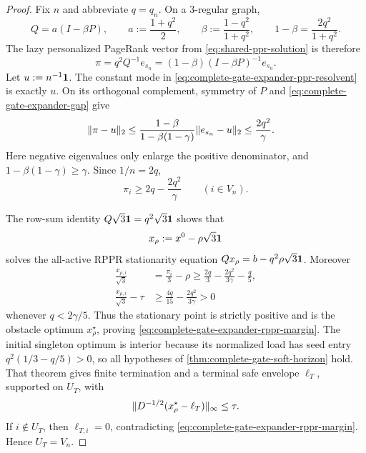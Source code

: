 \begin{proof}
Fix $n$ and abbreviate $q=q_n$.  On a $3$-regular graph,
\begin{equation*}
 Q=a(I-\beta P),
 \qquad
 a:=\frac{1+q^2}{2},
 \qquad
 \beta:=\frac{1-q^2}{1+q^2},
 \qquad
 1-\beta=\frac{2q^2}{1+q^2}.
\end{equation*}
The lazy personalized PageRank vector from
\cref{eq:shared-ppr-solution} is therefore
\begin{equation}
 \pi=q^2Q^{-1}e_{s_n}
     =(1-\beta)(I-\beta P)^{-1}e_{s_n}.
 \label{eq:complete-gate-expander-ppr-resolvent}
\end{equation}
Let $u:=n^{-1}\mathbf{1}$.  The constant mode in
\cref{eq:complete-gate-expander-ppr-resolvent} is exactly $u$.  On its
orthogonal complement, symmetry of $P$ and
\cref{eq:complete-gate-expander-gap} give
\begin{align}
 \lVert\pi-u\rVert_2
 &\leq
 \frac{1-\beta}{1-\beta(1-\gamma)}
 \lVert e_{s_n}-u\rVert_2
 \leq\frac{2q^2}{\gamma}.
 \label{eq:complete-gate-expander-ppr-deviation}
\end{align}
Here negative eigenvalues only enlarge the positive denominator, and
$1-\beta(1-\gamma)\geq\gamma$.  Since $1/n=2q$,
\begin{equation}
 \pi_i\geq2q-\frac{2q^2}{\gamma}
 \qquad(i\in V_n).
 \label{eq:complete-gate-expander-ppr-floor}
\end{equation}

The row-sum identity $Q\sqrt3\mathbf{1}=q^2\sqrt3\mathbf{1}$ shows that
\begin{equation}
 x_{\rho} := x^0-\rho\sqrt3\mathbf{1}
 \label{eq:complete-gate-expander-shifted-point}
\end{equation}
solves the all-active RPPR stationarity equation
$Qx_\rho=b-q^2\rho\sqrt3\mathbf{1}$.  Moreover
\begin{align}
 \frac{x_{\rho,i}}{\sqrt3}
 &=\frac{\pi_i}{3}-\rho
 \geq\frac{2q}{3}-\frac{2q^2}{3\gamma}-\frac q5,
 \\
 \frac{x_{\rho,i}}{\sqrt3}-\tau
 &\geq\frac{4q}{15}-\frac{2q^2}{3\gamma}>0
 \label{eq:complete-gate-expander-shift-margin}
\end{align}
whenever $q<2\gamma/5$.  Thus the stationary point is strictly positive and
is the obstacle optimum $x_\rho^\star$, proving
\cref{eq:complete-gate-expander-rppr-margin}.  The initial singleton optimum
is interior because its normalized load has seed entry
$q^2(1/3-q/5)>0$, so all hypotheses of
\cref{thm:complete-gate-soft-horizon} hold.  That theorem gives finite
termination and a terminal safe envelope $\ell_T$, supported on $U_T$, with
\begin{equation*}
 \lVert D^{-1/2}(x_\rho^\star-\ell_T)\rVert_\infty\leq\tau.
\end{equation*}
If $i\notin U_T$, then $\ell_{T,i}=0$, contradicting
\cref{eq:complete-gate-expander-rppr-margin}.  Hence $U_T=V_n$.


\end{proof}
